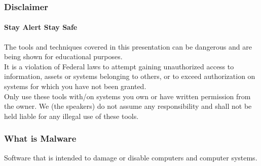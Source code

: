 \documentclass[aspectratio=169]{beamer}
\begin{document}
\begin{frame}
  \frametitle{Disclaimer}
  \framesubtitle{Stay Alert Stay Safe}
  \begin{tcolorbox}[title=disclaimer.log,colback=gray]
    The tools and techniques covered in this presentation can be dangerous and are\\
    being shown for educational purposes.\\
    \newline
    It is a violation of Federal laws to attempt gaining unauthorized access to information, assets or systems belonging to others, or to exceed authorization on systems for which you have not been granted.\\
    \newline
    Only use these tools with/on systems you own or have written permission from the owner. We (the speakers) do not assume any responsibility and shall not be held liable for any illegal use of these tools.\\
  \end{tcolorbox}
\end{frame}

\begin{frame}
  \frametitle{What is Malware}
  \begin{center}
    \begin{tcolorbox}[title=\href{https://en.wikipedia.org/wiki/Malware}{Definition of Malware},colback=gray]
      Software that is intended to damage or disable computers and computer systems.
    \end{tcolorbox}
  \end{center}
\end{frame}
\end{document}
